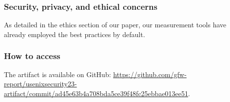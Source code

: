 
\subsubsection{Security, privacy, and ethical concerns}
As detailed in the ethics section of our paper,
our measurement tools have already employed the best practices by default.
\subsubsection{How to access}

The artifact is available on GitHub:
\url{https://github.com/gfw-report/usenixsecurity23-artifact/commit/ad45e63b4a708bda5ce39f48fc25ebbae013ee51}.


